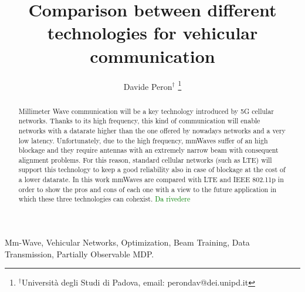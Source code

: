 \documentclass[10pt, conference, letterpaper]{IEEEtran}
\title{Comparison between different technologies for vehicular communication}
\author{Davide Peron$^\dag$
\thanks{$^\dag$Università degli Studi di Padova, email: perondav@dei.unipd.it}
}
\newcommand\DP[1]{\textcolor{green}{#1}}
\begin{document}
\maketitle

\begin{abstract}
Millimeter Wave communication will be a key technology introduced by 5G cellular networks. Thanks to its high frequency, this kind of communication will enable networks with a datarate higher than the one offered by nowadays networks and a very low latency. Unfortunately, due to the high frequency, mmWaves suffer of an high blockage and they require antennas with an extremely narrow beam with consequent alignment problems.
For this reason, standard cellular networks (such as LTE) will support this technology to keep a good reliability also in case of blockage at the cost of a lower datarate.
In this work mmWaves are compared with LTE and IEEE 802.11p in order to show the pros and cons of each one with a view to the future application in which these three technologies can cohexist.
\DP{Da rivedere}
\end{abstract}

\IEEEkeywords
Mm-Wave, Vehicular Networks, Optimization, Beam Training, Data Transmission, Partially Observable MDP.
\endIEEEkeywords














\end{document}
